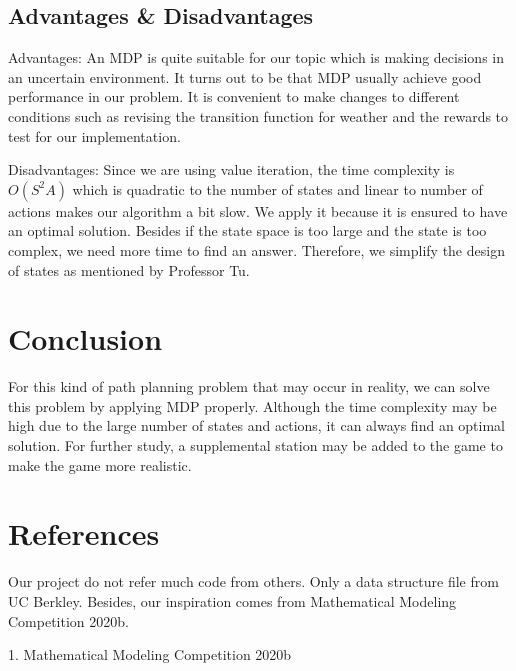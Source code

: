 \documentclass[10pt,twocolumn,letterpaper]{article}
\begin{document}
\subsection{Advantages \& Disadvantages}
Advantages: An MDP is quite suitable for our topic which is making 
decisions in an uncertain environment. It turns out to be that MDP 
usually achieve good performance in our problem. It is convenient to 
make changes to different conditions such as revising the transition 
function for weather and the rewards to test for our implementation.


Disadvantages: Since we are using value iteration, the time complexity 
is $O(S^2 A)$ which is quadratic to the number of states and linear to 
number of actions makes our algorithm a bit slow. 
We apply it because it is ensured to have an optimal solution. 
Besides if the state space is too large and the state is too complex, 
we need more time to find an answer. 
Therefore, we simplify the design of states as mentioned by Professor Tu.

\section{Conclusion}
For this kind of path planning problem that may occur in reality, 
we can solve this problem by applying MDP properly. Although the time 
complexity may be high due to the large number of states and actions, 
it can always find an optimal solution. For further study, a supplemental 
station may be added to the game to make the game more realistic.


\section{References}

Our project do not refer much code from others. Only a data structure file from UC Berkley.
Besides, our inspiration comes from Mathematical Modeling Competition 2020b.
\begin{center}
   1. Mathematical Modeling Competition 2020b
\end{center}
\end{document}
